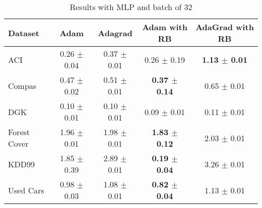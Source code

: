 \begin{table}[hb!]%
  \caption{Results with MLP and batch of 32}
  \label{tab:resultsMLP32}
  \begin{footnotesize}
  \begin{center}
  \begin{tabular}{l|cccc}
    \toprule
    Dataset      & Adam          & Adagrad     & Adam with RB          & AdaGrad with RB       \\
    \midrule                                                                                       
    ACI          & 0.26 $\pm$ 0.04 & 0.37 $\pm$ 0.01 & 0.26 $\pm$ 0.19          & \textbf{1.13 $\pm$ 0.01} \\
    Compas       & 0.47 $\pm$ 0.02 & 0.51 $\pm$ 0.01 & \textbf{0.37 $\pm$ 0.14} & 0.65 $\pm$ 0.01          \\
    DGK          & 0.10 $\pm$ 0.01 & 0.10 $\pm$ 0.01 & 0.09 $\pm$ 0.01          & 0.11 $\pm$ 0.01          \\
    Forest Cover & 1.96 $\pm$ 0.01 & 1.98 $\pm$ 0.01 & \textbf{1.83 $\pm$ 0.12} & 2.03 $\pm$ 0.01          \\
    KDD99        & 1.85 $\pm$ 0.39 & 2.89 $\pm$ 0.01 & \textbf{0.19 $\pm$ 0.04} & 3.26 $\pm$ 0.01          \\
    Used Cars    & 0.98 $\pm$ 0.03 & 1.08 $\pm$ 0.01 & \textbf{0.82 $\pm$ 0.04} & 1.13 $\pm$ 0.01          \\
  \bottomrule
\end{tabular}
\end{center}
\end{footnotesize}
\end{table}

